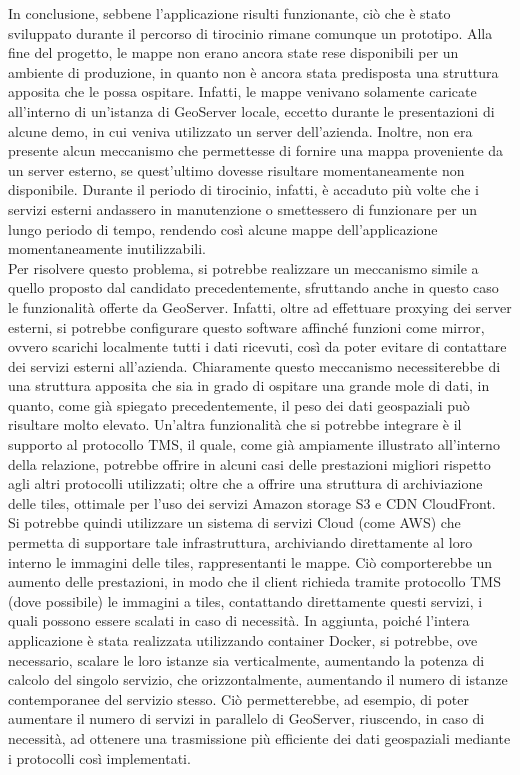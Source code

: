 In conclusione, sebbene l'applicazione risulti funzionante, ciò che è stato sviluppato durante il percorso di tirocinio rimane comunque un prototipo. Alla fine del progetto, le mappe non erano ancora state rese disponibili per un ambiente di produzione, in quanto non è ancora stata predisposta una struttura apposita che le possa ospitare. Infatti, le mappe venivano solamente caricate all'interno di un'istanza di GeoServer locale, eccetto durante le presentazioni di alcune demo, in cui veniva utilizzato un server dell'azienda. Inoltre, non era presente alcun meccanismo che permettesse di fornire una mappa proveniente da un server esterno, se quest'ultimo dovesse risultare momentaneamente non disponibile. Durante il periodo di tirocinio, infatti, è accaduto più volte che i servizi esterni andassero in manutenzione o smettessero di funzionare per un lungo periodo di tempo, rendendo così alcune mappe dell'applicazione momentaneamente inutilizzabili. 
\\Per risolvere questo problema, si potrebbe realizzare un meccanismo simile a quello proposto dal candidato precedentemente, sfruttando anche in questo caso le funzionalità offerte da GeoServer. Infatti, oltre ad effettuare proxying dei server esterni, si potrebbe configurare questo software affinché funzioni come mirror, ovvero scarichi localmente tutti i dati ricevuti, così da poter evitare di contattare dei servizi esterni all'azienda. Chiaramente questo meccanismo necessiterebbe di una struttura apposita che sia in grado di ospitare una grande mole di dati, in quanto, come già spiegato precedentemente, il peso dei dati geospaziali può risultare molto elevato.  Un'altra funzionalità che si potrebbe integrare è il supporto al protocollo TMS, il quale, come già ampiamente illustrato all'interno della relazione, potrebbe offrire in alcuni casi delle prestazioni migliori rispetto agli altri protocolli utilizzati; oltre che a offrire una struttura di archiviazione delle tiles, ottimale per l'uso dei servizi Amazon storage S3 e CDN CloudFront. Si potrebbe quindi utilizzare un sistema di servizi Cloud (come AWS) che permetta di supportare tale infrastruttura, archiviando direttamente al loro interno le immagini delle tiles, rappresentanti le mappe. Ciò comporterebbe un aumento delle prestazioni, in modo che il client richieda tramite protocollo TMS (dove possibile) le immagini a tiles, contattando direttamente questi servizi, i quali possono essere scalati in caso di necessità. In aggiunta, poiché l'intera applicazione è stata realizzata utilizzando container Docker, si potrebbe, ove necessario, scalare le loro istanze sia verticalmente, aumentando la potenza di calcolo del singolo servizio, che orizzontalmente, aumentando il numero di istanze contemporanee del servizio stesso. Ciò permetterebbe, ad esempio, di poter aumentare il numero di servizi in parallelo di GeoServer, riuscendo, in caso di necessità, ad ottenere una trasmissione più efficiente dei dati geospaziali mediante i protocolli così implementati.
